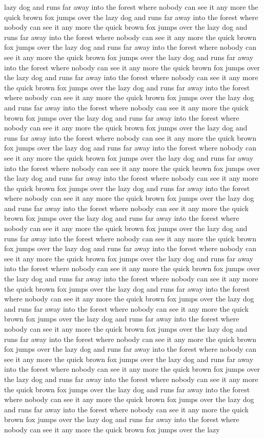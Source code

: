 \documentclass{article}
\begin{document}
{lazy dog and runs far away into the forest where nobody can see it any more the quick brown fox jumps over the lazy dog and runs far away into the forest where nobody can see it any more the quick brown fox jumps over the lazy dog and runs far away into the forest where nobody can see it any more the quick brown fox jumps over the lazy dog and runs far away into the forest where nobody can see it any more the quick brown fox jumps over the lazy dog and runs far away into the forest where nobody can see it any more the quick brown fox jumps over the lazy dog and runs far away into the forest where nobody can see it any more the quick brown fox jumps over the lazy dog and runs far away into the forest where nobody can see it any more the quick brown fox jumps over the lazy dog and runs far away into the forest where nobody can see it any more the quick brown fox jumps over the lazy dog and runs far away into the forest where nobody can see it any more the quick brown fox jumps over the lazy dog and runs far away into the forest where nobody can see it any more the quick brown fox jumps over the lazy dog and runs far away into the forest where nobody can see it any more the quick brown fox jumps over the lazy dog and runs far away into the forest where nobody can see it any more the quick brown fox jumps over the lazy dog and runs far away into the forest where nobody can see it any more the quick brown fox jumps over the lazy dog and runs far away into the forest where nobody can see it any more the quick brown fox jumps over the lazy dog and runs far away into the forest where nobody can see it any more the quick brown fox jumps over the lazy dog and runs far away into the forest where nobody can see it any more the quick brown fox jumps over the lazy dog and runs far away into the forest where nobody can see it any more the quick brown fox jumps over the lazy dog and runs far away into the forest where nobody can see it any more the quick brown fox jumps over the lazy dog and runs far away into the forest where nobody can see it any more the quick brown fox jumps over the lazy dog and runs far away into the forest where nobody can see it any more the quick brown fox jumps over the lazy dog and runs far away into the forest where nobody can see it any more the quick brown fox jumps over the lazy dog and runs far away into the forest where nobody can see it any more the quick brown fox jumps over the lazy dog and runs far away into the forest where nobody can see it any more the quick brown fox jumps over the lazy dog and runs far away into the forest where nobody can see it any more the quick brown fox jumps over the lazy dog and runs far away into the forest where nobody can see it any more the quick brown fox jumps over the lazy dog and runs far away into the forest where nobody can see it any more the quick brown fox jumps over the lazy dog and runs far away into the forest where nobody can see it any more the quick brown fox jumps over the lazy dog and runs far away into the forest where nobody can see it any more the quick brown fox jumps over the lazy dog and runs far away into the forest where nobody can see it any more the quick brown fox jumps over the lazy dog and runs far away into the forest where nobody can see it any more the quick brown fox jumps over the lazy }
\end{document}
